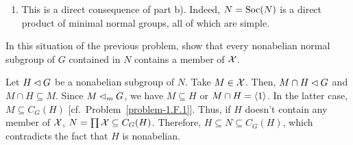 \begin{solution}
\begin{enumerate}[\rm a)]
\begin{proof}
\begin{enumerate}[\rm i)]
        \item To prove that $N\subseteq\Soc(N)$ we proceed by induction on the number of elements of $\cal Y$ (notation defined in part~a). The case $|{\cal Y}|=1$ is covered by part i). Assume that $|{\cal Y}|>1$ and pick $M\in\cal Y$ to define ${\cal Y}'={\cal Y}\setminus\set M$. According to the inductive hypothesis and the lemma
        $$
            \Soc\Big(\prod{\cal Y}'\Big)\Soc(M)=\Big(\prod{\cal Y'}\Big)M.
        $$
        Since the RHS is a direct product because $\prod{\cal Y}'\cap M=\gen1$, the same holds for the LHS. Moreover, the RHS equals $\prod\cal Y$, which is nothing but $N$. Using part iv), we get
        $$
            \Soc(N)
                =\Soc\Big(\prod{\cal Y}'\times M\Big)
                \supseteq\Soc\Big(\prod{\cal Y}'\Big)\times\Soc(M) = N.
        $$
    \end{enumerate}
    \end{proof}

    Now that we have established the hint, let's consider our problem, namely $M\normal_m N\implies M$ simple. Since $N=\Soc(N)$, we may assume that $N=MH$, where $H$ is the product of other minimal normal subgroups of~$N$, all having trivial intersection with $M$. Given that the product is direct, we have $M\leftrightarrow H$. Thus, if $\gen1\ne L\normal M$, we have $L\normal MH=N$ because $L\leftrightarrow H$ too. The minimality of $M$ in $N$ can be invoked to conclude that $L=M$. Thus $M$ has no proper normal subgroups, i.e., is simple.
    
    \item This is a direct consequence of part b). Indeed, $N=\Soc(N)$ is a direct product of minimal normal groups, all of which are simple.
\end{enumerate}
\end{solution}

\begin{probl}\label{problem-2.A.6}
    In this situation of the previous problem, show that every nonabelian normal subgroup of\/ $G$ contained in\/ $N$ contains a member of\/ $\cal X$.
\end{probl}

\begin{solution} Let $H\lhd G$ be a nonabelian subgroup of $N$. Take $M\in\cal X$. Then, $M\cap H\lhd G$ and $M\cap H\subseteq M$. Since $M\lhd_mG$, we have $M\subseteq H$ or $M\cap H=\langle1\rangle$. In the latter case, $M\subseteq C_G(H)$ [cf.~Problem~\ref{problem-1.F.1}]. Thus, if $H$ doesn't contain any member of $\cal X$, $N=\prod{\cal X}\subseteq C_G(H)$. Therefore, $H\subseteq N\subseteq C_G(H)$, which contradicts the fact that $H$ is nonabelian.  \end{solution}



